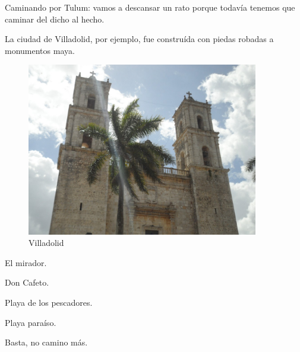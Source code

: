 \documentclass[12pt,twoside,openright,a5paper]{book}
\begin{document}
\vspace{0.5cm}
\hrulefill\hspace{0.2cm} \decofourleft\decofourright \hspace{0.2cm} \hrulefill
\vspace{0.5cm}

Caminando por Tulum: vamos a descansar un rato porque todavía tenemos que
caminar del dicho al hecho.


\vspace{0.5cm}
\hrulefill\hspace{0.2cm} \decofourleft\decofourright \hspace{0.2cm} \hrulefill
\vspace{0.5cm}

La ciudad de Villadolid, por ejemplo, 
fue construída con piedas robadas a monumentos maya.

\begin{figure}[H]
  \centering
    \includegraphics[width=0.9\textwidth]{fotos/2012/villadolid}
  \caption{Villadolid}
  \label{Villadolid}
\end{figure}


\vspace{0.5cm}
\hrulefill\hspace{0.2cm} \decofourleft\decofourright \hspace{0.2cm} \hrulefill
\vspace{0.5cm}

El mirador.

Don Cafeto.

Playa de los pescadores.

Playa paraíso.

Basta, no camino más.
\end{document}

